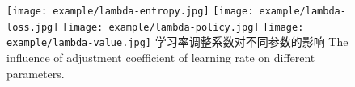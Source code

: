 
\begin{figure}[hbpt]
	\centering
	{\texttt{[image: example/lambda-entropy.jpg]}}
	{\texttt{[image: example/lambda-loss.jpg]}}
	\newline
	\centering
	{\texttt{[image: example/lambda-policy.jpg]}}
	{\texttt{[image: example/lambda-value.jpg]}}
	\bicaption
	{学习率调整系数对不同参数的影响}
	{The influence of adjustment coefficient of learning rate on different parameters.}
	\label{fig2response}
\end{figure}

